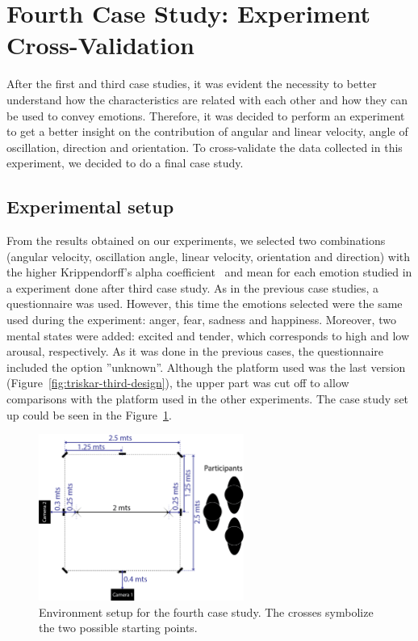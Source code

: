 \section{Fourth Case Study: Experiment Cross-Validation}

After the first and third case studies, it was evident the necessity to better understand how the characteristics are related with each other and how they can be used to convey emotions. Therefore, it was decided to perform an experiment to get a better insight on the contribution of angular and linear velocity, angle of oscillation, direction and orientation. To cross-validate the data collected in this experiment, we decided to do a final case study.

\subsection{Experimental setup}

From the results obtained on our experiments, we selected two combinations (angular velocity, oscillation angle, linear velocity, orientation and direction) with the higher Krippendorff's alpha coefficient~\cite{Klaus2007} and mean for each emotion studied in a experiment done after third case study. As in the previous case studies, a questionnaire was used. However, this time the emotions selected were the same used during the experiment: anger, fear, sadness and happiness. Moreover, two mental states were added: excited and tender, which corresponds to high and low arousal, respectively. As it was done in the previous cases, the questionnaire included the option ''unknown''. Although the platform used was the last version (Figure~\ref{fig:triskar-third-design}), the upper part was cut off to allow comparisons with the platform used in the other experiments. The case study set up could be seen in the Figure~\ref{fig:setup_fourth}.

\begin{figure}[h]
	\centering
	\includegraphics[width=0.60\textwidth]{./Images/FourthCase.png} 
	\caption{Environment setup for the fourth case study. The crosses symbolize the two possible starting points.}
	\label{fig:setup_fourth}
\end{figure}
 
